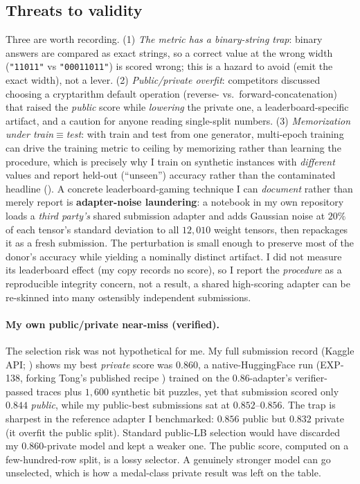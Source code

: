 \documentclass[11pt]{article}
\begin{document}
\subsection{Threats to validity}
Three are worth recording. (1) \emph{The metric has a
binary-string trap}: binary answers are compared as exact strings, so a correct value at the
wrong width (\texttt{"11011"} vs \texttt{"00011011"}) is scored wrong; this is a hazard to
avoid (emit the exact width), not a lever. (2) \emph{Public/private overfit}: competitors
discussed choosing a cryptarithm default operation (reverse- vs.\ forward-concatenation) that
raised the \emph{public} score while \emph{lowering} the private one, a leaderboard-specific
artifact, and a caution for anyone reading single-split numbers. (3) \emph{Memorization under
train$\equiv$test}: with train and test from one generator, multi-epoch training can drive
the training metric to ceiling by memorizing rather than learning the procedure, which is
precisely why I train on synthetic instances with \emph{different} values and report
held-out (``unseen'') accuracy rather than the contaminated headline ().
A concrete leaderboard-gaming technique I can \emph{document} rather than merely report is
\textbf{adapter-noise laundering}: a notebook in my own repository loads a \emph{third
party's} shared submission adapter and adds Gaussian noise at $20\%$ of each tensor's standard
deviation to all $12{,}010$ weight tensors, then repackages it as a fresh submission. The
perturbation is small enough to preserve most of the donor's accuracy while yielding a
nominally distinct artifact. I did not measure its leaderboard effect (my copy records no
score), so I report the \emph{procedure} as a reproducible integrity concern, not a
result, a shared high-scoring adapter can be re-skinned into many ostensibly independent
submissions.

\paragraph{My own public/private near-miss (verified).} The selection risk was not
hypothetical for me. My full submission record (Kaggle API; ) shows my
best \emph{private} score was $\mathbf{0.860}$, a native-HuggingFace run (EXP-138, forking
Tong's published recipe \citep{huikang_kaggle2026}) trained on the $0.86$-adapter's
verifier-passed traces plus $1{,}600$ synthetic bit puzzles, yet that submission scored only
$0.844$ \emph{public}, while my public-best submissions sat at $0.852$--$0.856$. The trap is
sharpest in the reference adapter I benchmarked: $0.856$ public but $0.832$ private (it
overfit the public split). Standard public-LB selection would have discarded my
$0.860$-private model and kept a weaker one. The public score, computed on a few-hundred-row
split, is a lossy selector. A genuinely stronger model can go unselected, which is how a
medal-class private result was left on the table.
\end{document}
